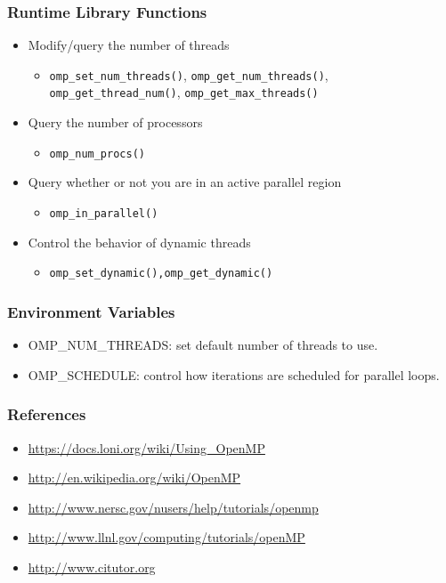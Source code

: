 \documentclass[slidestop,mathserif,compress,xcolor=svgnames]{beamer}
\begin{document}
\begin{frame}
  \frametitle{\small Runtime Library Functions}
  \begin{itemize}
    \item Modify/query the number of threads
    \begin{itemize}
      \item \texttt{omp\_set\_num\_threads()}, \texttt{omp\_get\_num\_threads()}, \texttt{omp\_get\_thread\_num()}, \texttt{omp\_get\_max\_threads()}
    \end{itemize}
    \item Query the number of processors
    \begin{itemize}
      \item \texttt{omp\_num\_procs()}
    \end{itemize}
    \item Query whether or not you are in an active parallel region
    \begin{itemize}
      \item \texttt{omp\_in\_parallel()}
    \end{itemize}
    \item Control the behavior of dynamic threads
    \begin{itemize}
      \item \texttt{omp\_set\_dynamic(),omp\_get\_dynamic()}
    \end{itemize}
  \end{itemize}
\end{frame}

\begin{frame}
  \frametitle{\small Environment Variables}
  \begin{itemize}
    \item OMP\_NUM\_THREADS: set default number of threads to use.
    \item OMP\_SCHEDULE: control how iterations are scheduled for parallel loops.
  \end{itemize}
\end{frame}

\begin{frame}
  \frametitle{\small References}
  \begin{itemize}
    \item \url{https://docs.loni.org/wiki/Using_OpenMP}
    \item \url{http://en.wikipedia.org/wiki/OpenMP}
    \item \url{http://www.nersc.gov/nusers/help/tutorials/openmp}
    \item \url{http://www.llnl.gov/computing/tutorials/openMP}
    \item \url{http://www.citutor.org}
  \end{itemize}
\end{frame}
\end{document}
